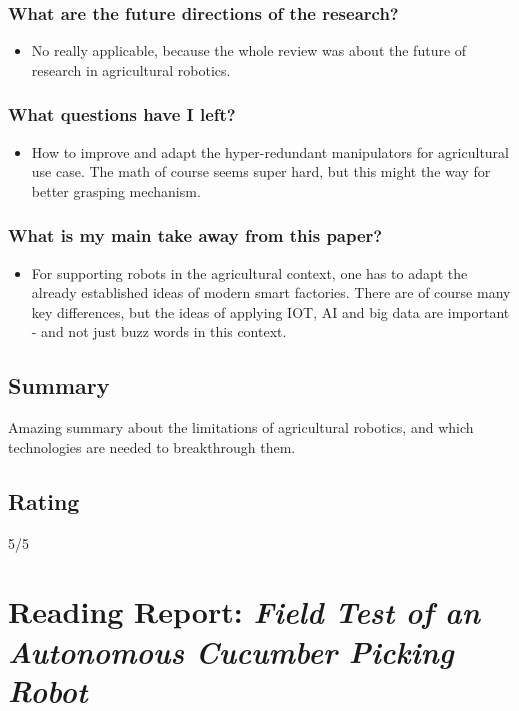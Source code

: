     \subsubsection*{What are the future directions of the research?}
    \begin{itemize}
        \item No really applicable, because the whole review was about the future of research in agricultural robotics.
    \end{itemize}
    \subsubsection*{What questions have I left?}
    \begin{itemize}
        \item How to improve and adapt the hyper-redundant manipulators for agricultural use case. The math of course seems super hard, but this might the way for better grasping mechanism.
    \end{itemize}
    \subsubsection*{What is my main take away from this paper?}
    \begin{itemize}
        \item For supporting robots in the agricultural context, one has to adapt the already established ideas of modern smart factories. There are of course many key differences, but the ideas of applying IOT, AI and big data are important  - and not just buzz words in this context.
    \end{itemize}
    
    \subsection*{Summary}
    Amazing summary about the limitations of agricultural robotics, and which technologies are needed to breakthrough them.
    
    \subsection*{Rating}
    5/5
    
    \newpage
    \section{Reading Report: \emph{Field Test of an Autonomous Cucumber Picking Robot}}
    \cite{Henten2003}
    
